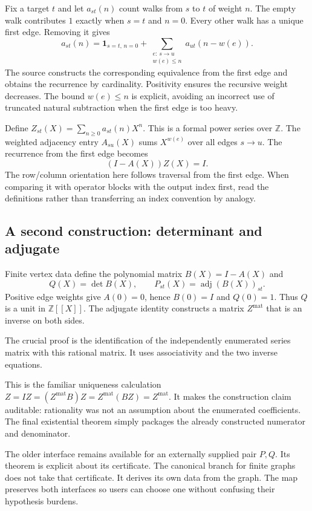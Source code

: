 Fix a target $t$ and let $a_{st}(n)$ count walks from $s$ to $t$ of weight $n$. The empty walk contributes $1$ exactly when $s=t$ and $n=0$. Every other walk has a unique first edge. Removing it gives
\[
a_{st}(n)=\mathbf 1_{s=t,\,n=0}
+\sum_{\substack{e:\,s\to u\\w(e)\le n}}a_{ut}(n-w(e)).
\]
The source constructs the corresponding equivalence from the first edge and obtains the recurrence by cardinality. Positivity ensures the recursive weight decreases. The bound $w(e)\le n$ is explicit, avoiding an incorrect use of truncated natural subtraction when the first edge is too heavy.

Define $Z_{st}(X)=\sum_{n\ge0}a_{st}(n)X^n$. This is a formal power series over $\mathbb Z$. The weighted adjacency entry $A_{su}(X)$ sums $X^{w(e)}$ over all edges $s\to u$. The recurrence from the first edge becomes
\[
(I-A(X))Z(X)=I.
\]
The row/column orientation here follows traversal from the first edge. When comparing it with operator blocks with the output index first, read the definitions rather than transferring an index convention by analogy.

\subsection{A second construction: determinant and adjugate}

Finite vertex data define the polynomial matrix $B(X)=I-A(X)$ and
\[
Q(X)=\det B(X),\qquad P_{st}(X)=\operatorname{adj}(B(X))_{st}.
\]
Positive edge weights give $A(0)=0$, hence $B(0)=I$ and $Q(0)=1$. Thus $Q$ is a unit in $\mathbb Z[\![X]\!]$. The adjugate identity constructs a matrix $Z^{\mathrm{mat}}$ that is an inverse on both sides.

The crucial proof is the identification of the independently enumerated series matrix with this rational matrix. It uses associativity and the two inverse equations.

This is the familiar uniqueness calculation $Z=I Z=(Z^{\mathrm{mat}}B)Z=Z^{\mathrm{mat}}(BZ)=Z^{\mathrm{mat}}$. It makes the construction claim auditable: rationality was not an assumption about the enumerated coefficients. The final existential theorem simply packages the already constructed numerator and denominator.

The older  interface remains available for an externally supplied pair $P,Q$. Its theorem is explicit about its certificate. The canonical branch for finite graphs does not take that certificate. It derives its own data from the graph. The map preserves both interfaces so users can choose one without confusing their hypothesis burdens.

